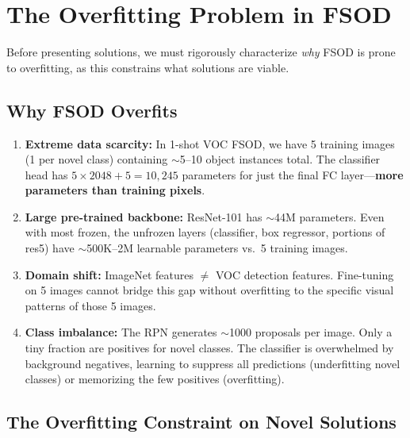\documentclass[11pt,a4paper]{article}
\begin{document}
\section{The Overfitting Problem in FSOD}
\label{sec:overfitting}

Before presenting solutions, we must rigorously characterize \textit{why} FSOD is prone to overfitting, as this constrains what solutions are viable.

\subsection{Why FSOD Overfits}

\begin{enumerate}
    \item \textbf{Extreme data scarcity:} In 1-shot VOC FSOD, we have 5 training images (1 per novel class) containing $\sim$5--10 object instances total. The classifier head has $5 \times 2048 + 5 = 10,245$ parameters for just the final FC layer---\textbf{more parameters than training pixels}.

    \item \textbf{Large pre-trained backbone:} ResNet-101 has $\sim$44M parameters. Even with most frozen, the unfrozen layers (classifier, box regressor, portions of res5) have $\sim$500K--2M learnable parameters vs.\ 5 training images.

    \item \textbf{Domain shift:} ImageNet features $\neq$ VOC detection features. Fine-tuning on 5 images cannot bridge this gap without overfitting to the specific visual patterns of those 5 images.

    \item \textbf{Class imbalance:} The RPN generates $\sim$1000 proposals per image. Only a tiny fraction are positives for novel classes. The classifier is overwhelmed by background negatives, learning to suppress all predictions (underfitting novel classes) or memorizing the few positives (overfitting).
\end{enumerate}

\subsection{The Overfitting Constraint on Novel Solutions}
\end{document}
